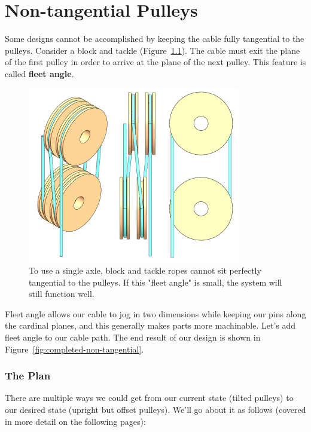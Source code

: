 \chapter{Non-tangential Pulleys}
\label{sec:non-tangential-pulleys}

Some designs cannot be accomplished by keeping the cable fully tangential to the
pulleys. Consider a block and tackle (Figure~\ref{fig:block_and_tackle}). The
cable must exit the plane of the first pulley in order to arrive at the plane of
the next pulley. This feature is called \textbf{fleet angle}.

\begin{figure}[H]
\begin{center}
\includegraphics{images/figures/BlockTackleCombined.png}
\end{center}
\caption{To use a single axle, block and tackle ropes cannot sit perfectly
tangential to the pulleys. If this "fleet angle" is small, the system will
still function well.
\label{fig:block_and_tackle}}

\end{figure}

Fleet angle allows our
cable to jog in two dimensions while keeping our pins along the cardinal planes, and this generally makes parts more machinable. Let's add fleet angle
to our cable path. The end result of our design is shown in
Figure~\ref{fig:completed-non-tangential}.

\subsection{The Plan}

There are multiple ways we could get from our current state (tilted pulleys) to
our desired state (upright but offset pulleys). We'll go about it as
follows (covered in more detail on the following pages):

